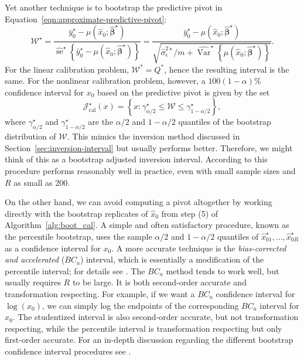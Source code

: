 \documentclass[cmfont,usenames,dvipsnames,leqno]{afit-etd}\usepackage[]{graphicx}\usepackage[]{color}
\newcommand{\boot}{\star} %
\newcommand{\mc}[1]{\ensuremath{\mathcal{#1}}}
\newcommand{\wh}[1]{\ensuremath{\widehat{#1}}}
\newcommand{\var}{\operatorname{Var}}
\newcommand{\se}{\operatorname{se}}
\begin{document}
Yet another technique \citep{jones_bootstrapping_1999, huet_statistical_2004} is to bootstrap the predictive pivot in Equation~\eqref{eqn:approximate-predictive-pivot}:
\begin{equation*}
  \mc{W}^{\boot} = \frac{\bar{y}_0^\boot - \mu\left(\wh{x}_0; \wh{\bm{\beta}}^\boot\right)}{\wh{\se}^\boot\left\{\bar{y}_0^\boot - \mu\left(\wh{x}_0; \wh{\bm{\beta}}^\boot\right)\right\}} = \frac{\bar{y}_0^\boot - \mu\left(\wh{x}_0; \wh{\bm{\beta}}^\boot\right)}{\sqrt{\wh{\sigma}_\epsilon^{2\boot}/m + \wh{\var}^\boot\left\{\mu\left(\wh{x}_0; \wh{\bm{\beta}}^\boot\right)\right\}}}.
\end{equation*}
For the linear calibration problem, $\mc{W}^{*} = Q^{*}$, hence the resulting interval is the same. For the nonlinear calibration problem, however, a $100(1-\alpha)\%$ confidence interval for $x_0$ based on the predictive pivot is given by the set
\begin{equation*}
	\mc{J}_\mathrm{cal}^\boot(x) = \left\{x: \gamma_{\alpha/2}^\boot \le \mc{W} \le \gamma_{1-\alpha/2}^\boot\right\},
\end{equation*}
where $\gamma_{\alpha/2}^\boot$ and $\gamma_{1-\alpha/2}^\boot$ are the $\alpha/2$ and $1-\alpha/2$ quantiles of the bootstrap distribution of $\mc{W}$. This mimics the inversion method discussed in Section~\ref{sec:inversion-interval} but usually performs better. Therefore, we might think of this as a bootstrap adjusted inversion interval. According to \citet{huet_statistical_2004} this procedure performs reasonably well in practice, even with small sample sizes and $R$ as small as 200.

On the other hand, we can avoid computing a pivot altogether by working directly with the bootstrap replicates of $\wh{x}_0$ from step (5) of Algorithm~\ref{alg:boot_cal}. A simple and often satisfactory procedure, known as the percentile bootstrap, uses the sample $\alpha/2$ and $1 - \alpha/2$ quantiles of $\wh{x}_{01}^\boot, \dotsc, \wh{x}_{0R}^\boot$ as a confidence interval for $x_0$. A more accurate technique is the \textit{bias-corrected and accelerated} ($BC_a$) interval, which is essentially a modification of the percentile interval; for details see \citet[chap. 14, sec. 3]{efron_boot_1994}. The $BC_a$ method tends to work well, but usually requires $R$ to be large. It is both second-order accurate \citep[pp. 187]{efron_boot_1994} and transformation respecting. For example, if we want a $BC_a$ confidence interval for $\log(x_0)$, we can simply log the endpoints of the corresponding $BC_a$ interval for $x_0$. The studentized interval is also second-order accurate, but not transformation respecting, while the percentile interval is transformation respecting but only first-order accurate. For an in-depth discussion regarding the different bootstrap confidence interval procedures see \citet[chap. 5]{davison_bootstrap_1997}.
\end{document}
